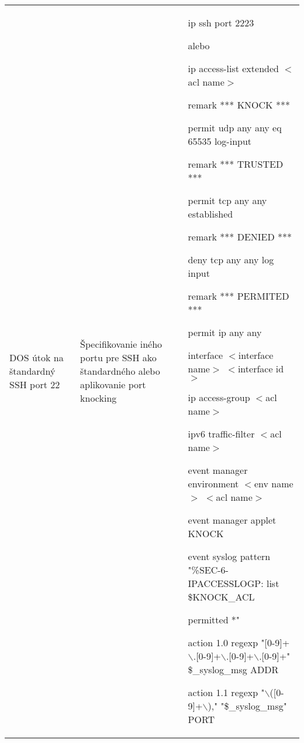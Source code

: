 \begin{longtable}[!htbp]{|L{10em}L{10em}>{\selectfont}L{34em}|}
	
	
	
	DOS útok na štandardný SSH port 22	&Špecifikovanie iného portu pre SSH ako štandardného alebo aplikovanie port knocking	&ip ssh port 2223
	
	\vspace{0.5em}
	{\selectfont alebo}
	\vspace{0.5em}
	
	ip access-list extended $<$acl name$>$
	
	\hspace{0.5em}remark *** KNOCK ***
	
	\hspace{0.5em}permit udp any any eq 65535 log-input
	
	\hspace{0.5em}remark *** TRUSTED ***
	
	\hspace{0.5em}permit tcp any any established
	
	\hspace{0.5em}remark *** DENIED ***
	
	\hspace{0.5em}deny   tcp any any log input
	
	\hspace{0.5em}remark *** PERMITED ***
	
	\hspace{0.5em}permit ip any any
	
	
	interface $<$interface name$>$ $<$interface id$>$
	
	\hspace{0.5em}ip access-group $<$acl name$>$
	
	\hspace{0.5em}ipv6 traffic-filter $<$acl name$>$
	
	event manager environment $<$env name$>$ $<$acl name$>$
	
	event manager applet KNOCK
	
	\hspace{0.5em}event syslog pattern "\%SEC-6-IPACCESSLOGP: list \$KNOCK\_ACL
	
	\hspace{1em}permitted *"
	
	\hspace{0.5em}action 1.0 regexp "[0-9]+$\backslash$.[0-9]+$\backslash$.[0-9]+$\backslash$.[0-9]+" \$\_syslog\_msg ADDR
	
	\hspace{0.5em}action 1.1 regexp "$\backslash$([0-9]+$\backslash$)," "\$\_syslog\_msg" PORT
	

\end{longtable}
